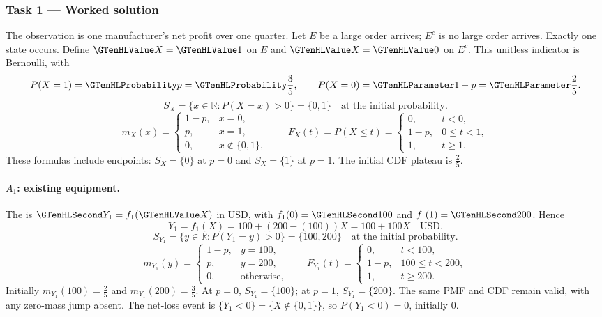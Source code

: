\subsubsection*{Task 1 --- Worked solution}\label{sol:c3-manufacturing-model}
The observation is one manufacturer's net profit over one quarter. Let $E$ be a large order arrives; $E^c$ is no large order arrives. Exactly one state occurs. Define $\Indicator{X}=\Indicator{1}$ on $E$ and $\Indicator{X}=\Indicator{0}$ on $E^c$. This unitless indicator is Bernoulli, with
\[P(X=1)=\SuccessProb{p}=\SuccessProb{\frac{3}{5}},\qquad P(X=0)=\FailureProb{1-p}=\FailureProb{\frac{2}{5}}.\]
\[S_X=\{x\in\mathbb R:P(X=x)>0\}=\{0,1\}\quad\text{at the initial probability}.\]
\[m_X(x)=\begin{cases}1-p,&x=0,\\p,&x=1,\\0,&x\notin\{0,1\},\end{cases}\qquad F_X(t)=P(X\leq t)=\begin{cases}0,&t<0,\\1-p,&0\leq t<1,\\1,&t\geq1.\end{cases}\]
These formulas include endpoints: $S_X=\{0\}$ at $p=0$ and $S_X=\{1\}$ at $p=1$. The initial CDF plateau is $\frac{2}{5}$.
\paragraph{$A_1$: existing equipment.}
The  is $\Money{Y_1}=f_1(\Indicator{X})$ in USD, with $f_1(0)=\Money{100}$ and $f_1(1)=\Money{200}$. Hence
\[Y_1=f_1(X)=100+(200-(100))X=100+100X\quad\text{USD}.\]
\[S_{Y_1}=\{y\in\mathbb R:P(Y_1=y)>0\}=\{100,200\}\quad\text{at the initial probability}.\]
\[m_{Y_1}(y)=\begin{cases}1-p,&y=100,\\p,&y=200,\\0,&\text{otherwise},\end{cases}\qquad F_{Y_1}(t)=\begin{cases}0,&t<100,\\1-p,&100\leq t<200,\\1,&t\geq 200.\end{cases}\]
Initially $m_{Y_1}(100)=\frac{2}{5}$ and $m_{Y_1}(200)=\frac{3}{5}$. At $p=0$, $S_{Y_1}=\{100\}$; at $p=1$, $S_{Y_1}=\{200\}$. The same PMF and CDF remain valid, with any zero-mass jump absent.
The net-loss event is $\{Y_1<0\}=\{X\notin\{0,1\}\}$, so $P(Y_1<0)=0$, initially $0$.
